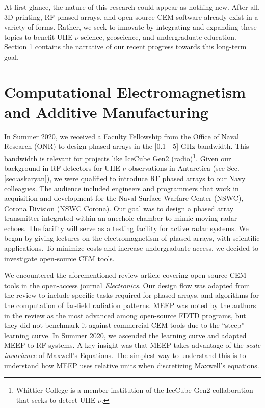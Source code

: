 \documentclass[11pt]{amsart}
\begin{document}
At first glance, the nature of this research could appear as nothing new.  After all, 3D printing, RF phased arrays, and open-source CEM software already exist in a variety of forms.  Rather, we seek to innovate by integrating and expanding these topics to benefit UHE-$\nu$ science, geoscience, and undergraduate education.  Section \ref{sec:cem} contains the narrative of our recent progress towards this long-term goal.

\section{Computational Electromagnetism and Additive Manufacturing}
\label{sec:cem}

In Summer 2020, we received a Faculty Fellowship from the Office of Naval Research (ONR) to design phased arrays in the [0.1 - 5] GHz bandwidth.  This bandwidth is relevant for projects like IceCube Gen2 (radio)\footnote{Whittier College is a member institution of the IceCube Gen2 collaboration that seeks to detect UHE-$\nu$.}.  Given our background in RF detectors for UHE-$\nu$ observations in Antarctica (see Sec. \ref{sec:askaryan}), we were qualified to introduce RF phased arrays to our Navy colleagues.  The audience included engineers and programmers that work in acquisition and development for the Naval Surface Warfare Center (NSWC), Corona Division (NSWC Corona).  Our goal was to design a phased array transmitter integrated within an anechoic chamber to mimic moving radar echoes.  The facility will serve as a testing facility for active radar systems.  We began by giving lectures on the electromagnetism of phased arrays, with scientific applications.  To minimize costs and increase undergraduate access, we decided to investigate open-source CEM tools. 


We encountered the aforementioned review article covering open-source CEM tools in the open-access journal \textit{Electronics}.  Our design flow was adapted from the review to include specific tasks required for phased arrays, and algorithms for the computation of far-field radiation patterns.  MEEP was noted by the authors in the review as the most advanced among open-source FDTD programs, but they did not benchmark it against commercial CEM tools due to the ``steep'' learning curve.  In Summer 2020, we ascended the learning curve and adapted MEEP to RF systems.  A key insight was that MEEP takes advantage of the \textit{scale invariance} of Maxwell's Equations.  The simplest way to understand this is to understand how MEEP uses relative units when discretizing Maxwell's equations. 
\end{document}
